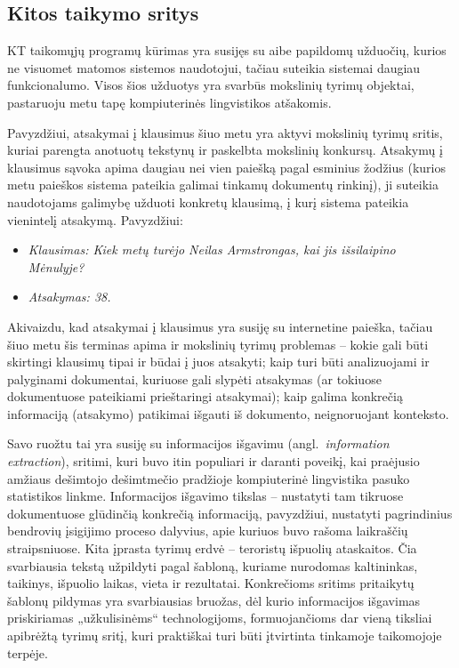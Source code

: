 \begin{multicols}{2}
\subsection{Kitos taikymo sritys }

 KT taikomųjų programų kūrimas yra susijęs su aibe papildomų užduočių, kurios ne visuomet matomos sistemos naudotojui, tačiau suteikia sistemai daugiau funkcionalumo. Visos šios užduotys yra svarbūs mokslinių tyrimų objektai, pastaruoju metu tapę kompiuterinės lingvistikos atšakomis. 

Pavyzdžiui, atsakymai į klausimus šiuo metu yra aktyvi mokslinių tyrimų sritis, kuriai parengta anotuotų tekstynų ir paskelbta mokslinių konkursų. Atsakymų į klausimus sąvoka apima daugiau nei vien paiešką pagal esminius žodžius (kurios metu paieškos sistema pateikia galimai tinkamų dokumentų rinkinį), ji suteikia naudotojams galimybę užduoti konkretų klausimą, į kurį sistema pateikia vienintelį atsakymą. Pavyzdžiui:

\begin{itemize}
\item[] \textit{Klausimas: Kiek metų turėjo Neilas Armstrongas, kai jis išsilaipino Mėnulyje?}
\item[] \textit{Atsakymas: 38.}
\end{itemize}

Akivaizdu, kad atsakymai į klausimus yra susiję su internetine paieška, tačiau šiuo metu šis terminas apima ir mokslinių tyrimų problemas – kokie gali būti skirtingi klausimų tipai ir būdai į juos atsakyti; kaip turi būti analizuojami ir palyginami dokumentai, kuriuose gali slypėti atsakymas (ar tokiuose dokumentuose pateikiami prieštaringi atsakymai); kaip galima konkrečią informaciją (atsakymo) patikimai išgauti iš dokumento, neignoruojant konteksto.    



Savo ruožtu tai yra susiję su informacijos išgavimu (angl.~\textit{information extraction}), sritimi, kuri buvo itin populiari ir daranti poveikį, kai praėjusio amžiaus dešimtojo dešimtmečio pradžioje kompiuterinė lingvistika pasuko statistikos linkme. Informacijos išgavimo tikslas – nustatyti tam tikruose dokumentuose glūdinčią konkrečią informaciją, pavyzdžiui, nustatyti pagrindinius bendrovių įsigijimo proceso dalyvius, apie kuriuos buvo rašoma laikraščių straipsniuose. Kita įprasta tyrimų erdvė – teroristų išpuolių ataskaitos. Čia svarbiausia tekstą užpildyti pagal šabloną, kuriame nurodomas kaltininkas, taikinys, išpuolio laikas, vieta ir rezultatai. Konkrečioms sritims pritaikytų šablonų pildymas yra svarbiausias bruožas, dėl kurio informacijos išgavimas priskiriamas „užkulisinėms“ technologijoms, formuojančioms dar vieną tiksliai apibrėžtą tyrimų sritį, kuri praktiškai turi būti įtvirtinta tinkamoje taikomojoje terpėje.    


\end{multicols}
